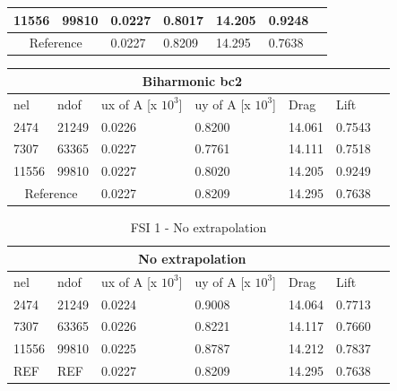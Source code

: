 \begin{table}[h!]
\begin{tabular}{ |p{1cm}||p{1cm}|p{2.5cm}|p{2.5cm}|p{2.7cm}|p{2.7cm}|p{1.2cm}|}
 11556   & 99810  &       0.0227  &       0.8017 & 14.205 & 0.9248 \\
  \hline
 \multicolumn{2}{|c|}{Reference} &  0.0227      &       0.8209      & 14.295  & 0.7638   \\
 \hline
\end{tabular}
\begin{tabular}{ |p{1cm}||p{1cm}|p{2.5cm}|p{2.5cm}|p{2.7cm}|p{2.7cm}|p{1.2cm}|}
 \hline
  \multicolumn{6}{|c|}{Biharmonic bc2} \\
   \hline
nel & ndof & ux of A [x $10^{3}$]  &uy of A [x $10^{3}$]& Drag  & Lift \\
 \hline
 2474    & 21249  &       0.0226 &       0.8200 & 14.061 & 0.7543 \\
 7307    & 63365  &       0.0227 &       0.7761 & 14.111 & 0.7518 \\
 11556   & 99810  &       0.0227 &       0.8020 & 14.205 & 0.9249  \\
  \hline
 \multicolumn{2}{|c|}{Reference} &  0.0227      &       0.8209      & 14.295  & 0.7638   \\
 \hline
\end{tabular}
\end{table}


\begin{table}[h!]
\centering
\caption{FSI 1 - No extrapolation}
\label{FSI1- No extrapolation}
\begin{tabular}{ |p{1cm}||p{1cm}|p{2.5cm}|p{2.5cm}|p{2.7cm}|p{2.7cm}|p{1.2cm}|}
 \hline
  \multicolumn{6}{|c|}{No extrapolation} \\
   \hline
nel & ndof & ux of A [x $10^{3}$]  &uy of A [x $10^{3}$]& Drag  & Lift \\
 \hline
 2474    & 21249  &       0.0224 &       0.9008 & 14.064 & 0.7713 \\
 7307    & 63365  &       0.0226  &       0.8221 & 14.117 & 0.7660 \\
 11556   & 99810  &       0.0225 &       0.8787 & 14.212 & 0.7837 \\
  \hline
 REF     & REF    &       0.0227      &       0.8209      & 14.295  & 0.7638   \\
 \hline
\end{tabular}

\end{table}




\newpage \newpage
